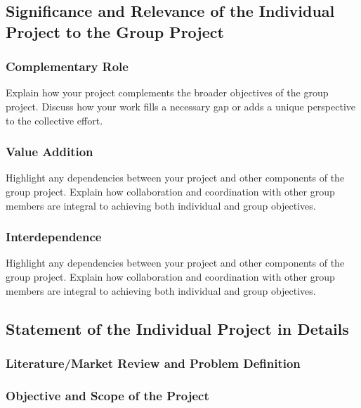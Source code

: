 \documentclass[12pt]{article}
\newenvironment{subsubs}{\adjustwidth{4em}{0pt}}{\endadjustwidth}
\begin{document}
\subsection{Significance and Relevance of the Individual Project to the Group Project}
\subsubsection{Complementary Role}
\begin{subsubs}

Explain how your project complements the broader objectives of the group project. Discuss how your work fills a necessary gap or adds a unique perspective to the collective effort.

\end{subsubs}

\subsubsection{Value Addition}
\begin{subsubs}

Highlight any dependencies between your project and other components of the group project. Explain how collaboration and coordination with other group members are integral to achieving both individual and group objectives.

\end{subsubs}

\subsubsection{Interdependence}
\begin{subsubs}

Highlight any dependencies between your project and other components of the group project. Explain how collaboration and coordination with other group members are integral to achieving both individual and group objectives.

\end{subsubs}

\subsection{Statement of the Individual Project in Details}
\subsubsection{Literature/Market Review and Problem Definition}
\subsubsection{Objective and Scope of the Project}
\end{document}
